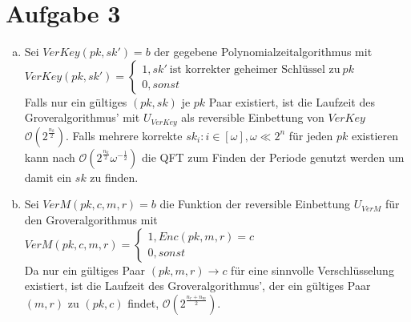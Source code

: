 \documentclass[a4paper]{scrartcl}
\begin{document}
\section*{Aufgabe 3}
\begin{enumerate}[a)]
\item Sei $VerKey(pk,sk')=b$ der gegebene Polynomialzeitalgorithmus mit\\
$VerKey(pk,sk')=\begin{cases} 1, sk' ~\text{ist korrekter geheimer Schlüssel zu}~ pk\\0, sonst \end{cases}$\\
Falls nur ein gültiges $(pk, sk)$ je $pk$ Paar existiert, ist die Laufzeit des Groveralgorithmus' mit $U_{VerKey}$ als reversible Einbettung von $VerKey$ $\mathcal{O}(2^{\frac{n_k}{2}})$. Falls mehrere korrekte $sk_i:  i \in [\omega], \omega \ll 2^n$ für jeden $pk$ existieren kann nach $\mathcal{O}(2^{\frac{n_k}{2}}\omega^{-\frac{1}{2}})$ die QFT zum Finden der Periode genutzt werden um damit ein $sk$ zu finden.
\item Sei $VerM(pk,c,m,r)=b$ die Funktion der reversible Einbettung $U_{VerM}$ für den Groveralgorithmus mit\\
$VerM(pk,c,m,r)=\begin{cases} 1, Enc(pk,m,r)=c\\0, sonst \end{cases}$\\
Da nur ein gültiges Paar $(pk,m,r)\rightarrow c$ für eine sinnvolle Verschlüsselung existiert, ist die Laufzeit des Groveralgorithmus', der ein gültiges Paar $(m,r)$ zu $(pk,c)$ findet, $\mathcal{O}(2^{\frac{n_r+n_m}{2}})$.
\end{enumerate}
\end{document}
